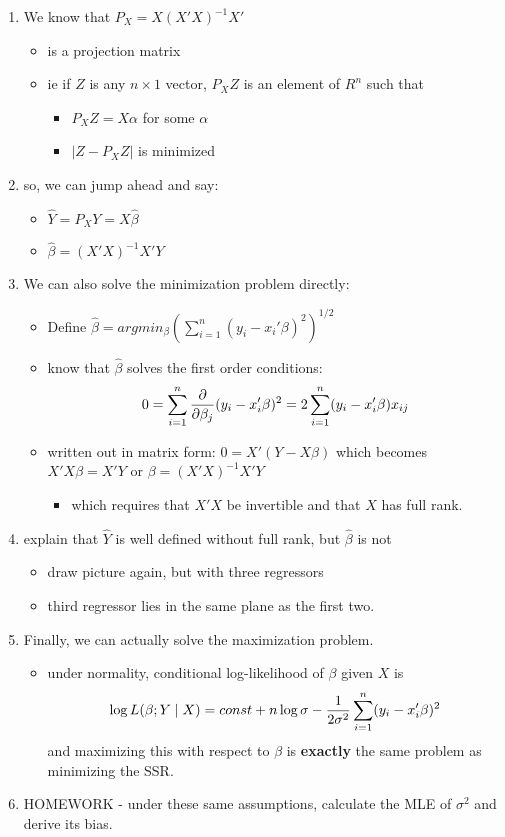 \begin{enumerate}
\item We know that $P_X = X(X'X)^{-1}X'$
\begin{itemize}
\item is a projection matrix
\item ie if $Z$ is any $n\times1$ vector, $P_X Z$ is an element of
            $R^n$ such that
\begin{itemize}
\item $P_X Z = X \alpha$ for some $\alpha$
\item $| Z - P_X Z |$ is minimized
\end{itemize}
\end{itemize}
\item so, we can jump ahead and say:
\begin{itemize}
\item $\hat Y = P_X Y = X \hat\beta$
\item $\hat \beta = (X'X)^{-1} X'Y$
\end{itemize}
\item We can also solve the minimization problem directly:
\begin{itemize}
\item Define $\hat \beta = argmin_\beta \left(\sum_{i=1}^n (y_i -
            x_i'\beta)^2 \right)^{1/2}$
\item know that $\hat \beta$ solves the first order conditions:
            \[ 0 = \sum_{i=1}^n {\partial \over \partial \beta_j} (y_i -
            x_i'\beta)^2 = 2 \sum_{i=1}^n (y_i - x_i'\beta) x_{ij} \]
\item written out in matrix form: $0 = X'(Y - X\beta)$ which
            becomes $X'X\beta = X'Y$ or $\beta = (X'X)^{-1}X'Y$
\begin{itemize}
\item which requires that $X'X$ be invertible and that $X$ has
              full rank.
\end{itemize}
\end{itemize}
\item explain that $\hat Y$ is well defined without full rank, but
          $\hat \beta$ is not
\begin{itemize}
\item draw picture again, but with three regressors
\item third regressor lies in the same plane as the first two.
\end{itemize}
\item Finally, we can actually solve the maximization problem.
\begin{itemize}
\item under normality, conditional log-likelihood of $\beta$ given
            $X$ is 
            \[ \log L(\beta; Y \mid X) = const + n \log \sigma - {1
            \over 2 \sigma^2} \sum_{i = 1}^n (y_i - x_i'\beta)^2 \]
            and maximizing this with respect to $\beta$ is \textbf{exactly} the
            same problem as minimizing the SSR.
\end{itemize}
\item HOMEWORK - under these same assumptions, calculate the MLE of
          $\sigma^2$ and derive its bias.
\end{enumerate}
